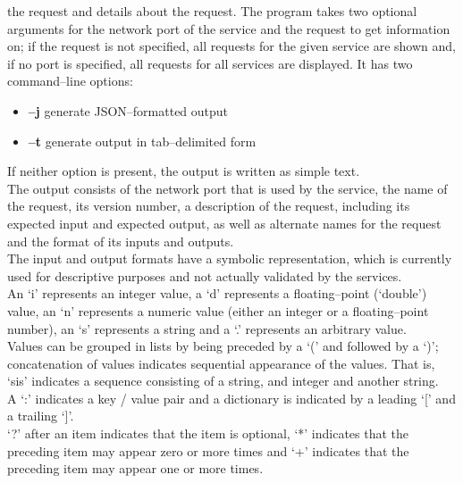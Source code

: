 the request and details about the request.
The program takes two optional arguments for the \yarp{} network port of the service and
the request to get information on; if the request is not specified, all requests for the
given service are shown and, if no port is specified, all requests for all services are
displayed.
It has two command--line options:
\begin{itemize}
\item \textbf{--j} generate JSON--formatted output
\item \textbf{--t} generate output in tab--delimited form
\end{itemize}
If neither option is present, the output is written as simple text.\\

The output consists of the \yarp{} network port that is used by the service, the name of
the request, its version number, a description of the request, including its expected
input and expected output, as well as alternate names for the request and the format of
its inputs and outputs.\\

The input and output formats have a symbolic representation, which is currently used for
descriptive purposes and not actually validated by the services.\\

An `i' represents an integer value, a `d' represents a floating--point (`double') value,
an `n' represents a numeric value (either an integer or a floating--point number), an `s'
represents a string and a `.' represents an arbitrary value.\\

Values can be grouped in lists by being preceded by a `(' and followed by a `)';
concatenation of values indicates sequential appearance of the values.
That is, `sis' indicates a sequence consisting of a string, and integer and another
string.\\

A `:' indicates a key / value pair and a dictionary is indicated by a leading `[' and a
trailing `]'.\\

`?' after an item indicates that the item is optional, `*' indicates that the preceding
item may appear zero or more times and `+' indicates that the preceding item may appear
one or more times.\\

